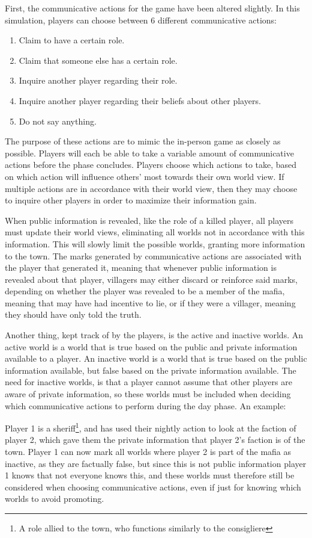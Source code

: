 First, the communicative actions for the game have been altered slightly. In
this simulation, players can choose between 6 different communicative actions:
\begin{enumerate}
	\itemsep0px
	\item \label{Com}Claim to have a certain role.
	\item Claim that someone else has a certain role.
	\item Inquire another player regarding their role.
	\item Inquire another player regarding their beliefs about other players.
	\item Do not say anything. \label{lst:communicativeActions}
\end{enumerate}
The purpose of these actions are to mimic the in-person game as closely as
possible. Players will each be able to take a variable amount of communicative actions before the
phase concludes. Players choose which actions to take, based on which action
will influence others’ most towards their own world view. If multiple actions
are in accordance with their world view, then they may choose to inquire other
players in order to maximize their information gain.

When public information is revealed, like the role of a killed player, all
players must update their world views, eliminating all worlds not in accordance
with this information. This will slowly limit the possible worlds, granting
more information to the town. The marks generated by communicative actions are
associated with the player that generated it, meaning that whenever public
information is revealed about that player, villagers may either discard or
reinforce said marks, depending on whether the player was revealed to be a
member of the mafia, meaning that may have had incentive to lie, or if they
were a villager, meaning they should have only told the truth.

Another thing, kept track of by the players, is the active and inactive worlds.
An active world is a world that is true based on the public and private
information available to a player. An inactive world is a world that is true
based on the public information available, but false based on the private
information available. The need for inactive worlds, is that a player cannot
assume that other players are aware of private information, so these worlds
must be included when deciding which communicative actions to perform during
the day phase. An example:

Player 1 is a sheriff\footnote{A role allied to the town, who functions
	similarly to the consigliere}, and has used their nightly action to look at the
faction of player 2, which gave them the private information that player 2's
faction is of the town. Player 1 can now mark all worlds where player 2 is part
of the mafia as inactive, as they are factually false, but since this is not
public information player 1 knows that not everyone knows this, and these
worlds must therefore still be considered when choosing communicative actions,
even if just for knowing which worlds to avoid promoting.
